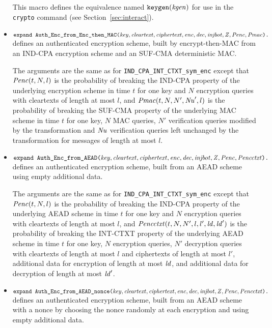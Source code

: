 \documentclass{article}
\begin{document}
\begin{itemize}
This macro defines the equivalence named $\texttt{keygen}(\mathit{kgen})$
   for use in the \texttt{crypto} command 
   (see Section~\ref{sec:interact}).

\item
  $\texttt{expand\ Auth\_Enc\_from\_Enc\_then\_MAC(}\vn{key}, \vn{cleartext}, \vn{ciphertext}, \vn{enc}, \vn{dec}, \vn{injbot}, \vn{Z}, \vn{Penc}, \vn{Pmac}\texttt{).}$ defines an authenticated encryption scheme, built by encrypt-then-MAC from an IND-CPA encryption scheme and an SUF-CMA deterministic MAC.

  The arguments are the same as for \texttt{IND\_CPA\_INT\_CTXT\_sym\_enc} except that $\mathit{Penc}(t, N, l)$ is the probability of breaking the IND-CPA
  property of the underlying encryption scheme in time $t$ for one key and $N$ encryption queries with
  cleartexts of length at most $l$, and
  $\mathit{Pmac}(t, N, N', \mathit{Nu}', l)$ is the probability of breaking the SUF-CMA
   property of the underlying MAC scheme in time $t$ for one key, $N$ MAC queries, $N'$ verification
   queries modified by the transformation and $\mathit{Nu}$ verification
   queries left unchanged by the transformation for messages of length at most $l$.

 \item 
   $\texttt{expand\ Auth\_Enc\_from\_AEAD(}\vn{key}, \vn{cleartext},
   \vn{ciphertext}, \vn{enc}, \vn{dec}, \vn{injbot}, \vn{Z},
   \vn{Penc}, \vn{Pencctxt}\texttt{).}$ defines an authenticated
   encryption scheme, built from an AEAD scheme using empty additional
   data.

   The arguments are the same as for
   \texttt{IND\_CPA\_INT\_CTXT\_sym\_enc} except that $\mathit{Penc}(t, N,
   l)$ is the probability of breaking the IND-CPA property of the
   underlying AEAD scheme in time $t$ for one key and $N$ encryption
   queries with cleartexts of length at most $l$, and
   $\mathit{Pencctxt}(t, N, N', l, l', \mathit{ld}, \mathit{ld}')$ is the
   probability of breaking the INT-CTXT property of the underlying
   AEAD scheme in time $t$ for one key, $N$ encryption queries, $N'$
   decryption queries with cleartexts of length at most $l$ and
   ciphertexts of length at most $l'$, additional data for encryption
   of length at most $\mathit{ld}$, and additional data for decryption of
   length at most $\mathit{ld}'$.
   
 \item 
   $\texttt{expand\ Auth\_Enc\_from\_AEAD\_nonce(}\vn{key}, \vn{cleartext},
   \vn{ciphertext}, \vn{enc}, \vn{dec}, \vn{injbot}, \vn{Z},
   \vn{Penc}, \vn{Pencctxt}\texttt{).}$ defines an authenticated
   encryption scheme, built from an AEAD scheme with a nonce
   by choosing the nonce randomly at each encryption and
   using empty additional data.


\end{itemize}
\end{document}
